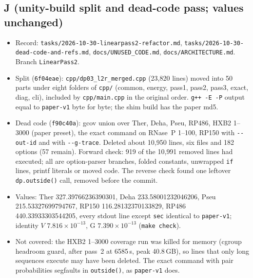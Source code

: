 \documentclass[11pt]{article}
\begin{document}
\subsection{J (unity-build split and dead-code pass; values unchanged)}
\begin{itemize}[leftmargin=*]
  \item Record: \texttt{tasks/}\allowbreak\texttt{2026-10-30-linearpass2-refactor.md}, \texttt{tasks/}\allowbreak\texttt{2026-10-30-dead-code-and-refs.md}, \texttt{docs/UNUSED\_CODE.md}, \texttt{docs/ARCHITECTURE.md}. Branch \texttt{LinearPass2}.
  \item Split (\texttt{6f04eae}): \texttt{cpp/dp03\_l2r\_merged.cpp} (23{,}820 lines) moved into 50 parts under eight folders of \texttt{cpp/} (common, energy, pass1, pass2, pass3, exact, diag, cli), included by \texttt{cpp/main.cpp} in the original order. \texttt{g++ -E -P} output equal to \texttt{paper-v1} byte for byte; the shim build has the paper md5.
  \item Dead code (\texttt{f90c40a}): gcov union over Ther, Deha, Pseu, RP486, HXB2 1--3000 (paper preset), the exact command on RNase~P 1--100, RP150 with \texttt{-{}-out-id} and with \texttt{-{}-g-trace}. Deleted about 10{,}950 lines, six files and 182 options (57 remain). Forward check: 919 of the 10{,}991 removed lines had executed; all are option-parser branches, folded constants, unwrapped \texttt{if} lines, printf literals or moved code. The reverse check found one leftover \texttt{dp.outside()} call, removed before the commit.
  \item Values: Ther 327.39766236390301, Deha 233.58001232046206, Pseu 215.53327699794767, RP150 116.28132370133829, RP486 440.33933303544205, every stdout line except \texttt{sec} identical to \texttt{paper-v1}; identity $V$ $7.816\times10^{-13}$, G $7.390\times10^{-13}$ (\texttt{make check}).
  \item Not covered: the HXB2 1--3000 coverage run was killed for memory (cgroup headroom guard, after pass~2 at 6585\,s, peak 40.8\,GB), so lines that only long sequences execute may have been deleted. The exact command with pair probabilities segfaults in \texttt{outside()}, as \texttt{paper-v1} does.
\end{itemize}
\end{document}
